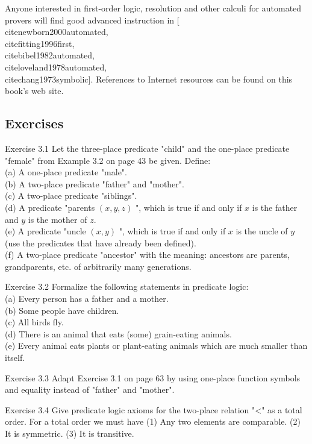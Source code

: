\documentclass[10pt]{book}
\begin{document}
Anyone interested in first-order logic, resolution and other calculi for automated provers will find good advanced instruction in [\\cite{newborn2000automated}, \\cite{fitting1996first}, \\cite{bibel1982automated}, \\cite{loveland1978automated}, \\cite{chang1973symbolic}]. References to Internet resources can be found on this book's web site.

\subsection*{Exercises}
Exercise 3.1 Let the three-place predicate "child" and the one-place predicate "female" from Example 3.2 on page 43 be given. Define:\\
(a) A one-place predicate "male".\\
(b) A two-place predicate "father" and "mother".\\
(c) A two-place predicate "siblings".\\
(d) A predicate "parents $(x, y, z)$ ", which is true if and only if $x$ is the father and $y$ is the mother of $z$.\\
(e) A predicate "uncle $(x, y)$ ", which is true if and only if $x$ is the uncle of $y$ (use the predicates that have already been defined).\\
(f) A two-place predicate "ancestor" with the meaning: ancestors are parents, grandparents, etc. of arbitrarily many generations.

Exercise 3.2 Formalize the following statements in predicate logic:\\

(a) Every person has a father and a mother.\\
(b) Some people have children.\\
(c) All birds fly.\\
(d) There is an animal that eats (some) grain-eating animals.\\
(e) Every animal eats plants or plant-eating animals which are much smaller than itself.

Exercise 3.3 Adapt Exercise 3.1 on page 63 by using one-place function symbols and equality instead of "father" and "mother".

Exercise 3.4 Give predicate logic axioms for the two-place relation "<" as a total order. For a total order we must have (1) Any two elements are comparable. (2) It is symmetric. (3) It is transitive.
\end{document}
